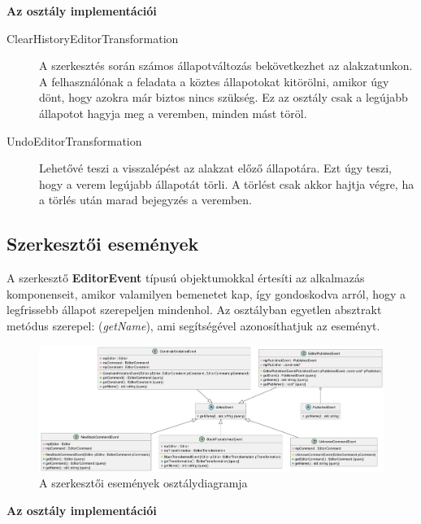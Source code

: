 \textbf{Az osztály implementációi}

\begin{description}
	\item[ClearHistoryEditorTransformation] A szerkesztés során számos állapotváltozás bekövetkezhet az alakzatunkon. A felhasználónak a feladata a köztes állapotokat kitörölni, amikor úgy dönt, hogy azokra már biztos nincs szükség. Ez az osztály csak a legújabb állapotot hagyja meg a veremben, minden mást töröl.
	\item[UndoEditorTransformation] Lehetővé teszi a visszalépést az alakzat előző állapotára. Ezt úgy teszi, hogy a verem legújabb állapotát törli. A törlést csak akkor hajtja végre, ha a törlés után marad bejegyzés a veremben.
\end{description}


\subsection{Szerkesztői események}

A szerkesztő \textbf{EditorEvent} típusú objektumokkal értesíti az alkalmazás komponenseit, amikor valamilyen bemenetet kap, így gondoskodva arról, hogy a legfrissebb állapot szerepeljen mindenhol. Az osztályban egyetlen absztrakt metódus szerepel: (\textit{getName}), ami segítségével azonosíthatjuk az eseményt.

\begin{figure}[H]
	\centering
	\includegraphics[width=1\linewidth]{images/class_editor_event.png}
	\caption{A szerkesztői események osztálydiagramja}
	\label{fig:class_editor_event-1}
\end{figure}

\textbf{Az osztály implementációi}

